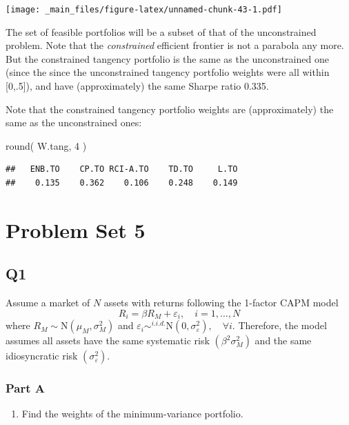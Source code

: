 \documentclass[
  oneside]{book}
\newenvironment{Shaded}{\begin{snugshade}}{\end{snugshade}}
\newcommand{\DecValTok}[1]{\textcolor[rgb]{0.00,0.00,0.81}{#1}}
\newcommand{\FunctionTok}[1]{\textcolor[rgb]{0.00,0.00,0.00}{#1}}
\newcommand{\NormalTok}[1]{#1}
\providecommand{\tightlist}{%
  \setlength{\itemsep}{0pt}\setlength{\parskip}{0pt}}
\begin{document}
\texttt{[image: \_main\_files/figure-latex/unnamed-chunk-43-1.pdf]}

The set of feasible portfolios will be a subset of that of the unconstrained problem. Note that the \emph{constrained} efficient frontier is not a parabola any more. But the constrained tangency portfolio is the same as the unconstrained one (since the since the unconstrained tangency portfolio weights were all within {[}0,.5{]}), and have (approximately) the same Sharpe ratio 0.335.

Note that the constrained tangency portfolio weights are (approximately) the same as the unconstrained ones:

\begin{Shaded}
\begin{Highlighting}[]
\FunctionTok{round}\NormalTok{( W.tang, }\DecValTok{4}\NormalTok{ )}
\end{Highlighting}
\end{Shaded}

\begin{verbatim}
##   ENB.TO    CP.TO RCI-A.TO    TD.TO     L.TO 
##    0.135    0.362    0.106    0.248    0.149
\end{verbatim}

\hypertarget{problem-set-5}{%
\chapter{Problem Set 5}\label{problem-set-5}}

\hypertarget{q1-3}{%
\section{Q1}\label{q1-3}}

Assume a market of \(N\) assets with returns following the 1-factor CAPM model
\[
R_i=\beta R_M+\varepsilon_i, \quad i=1, \ldots, N
\]
where \(R_M \sim \mathrm{N}\left(\mu_M, \sigma_M^2\right)\) and \(\varepsilon_i \sim^{i . i . d .} \mathrm{N}\left(0, \sigma_{\varepsilon}^2\right), \quad \forall i\). Therefore, the model assumes all assets have the same systematic risk \(\left(\beta^2 \sigma_M^2\right)\) and the same idiosyncratic risk \(\left(\sigma_{\varepsilon}^2\right)\).

\hypertarget{part-a-8}{%
\subsection{Part A}\label{part-a-8}}

\begin{enumerate}
\def\labelenumi{(\alph{enumi})}
\tightlist
\item
  Find the weights of the minimum-variance portfolio.
\end{enumerate}
\end{document}
